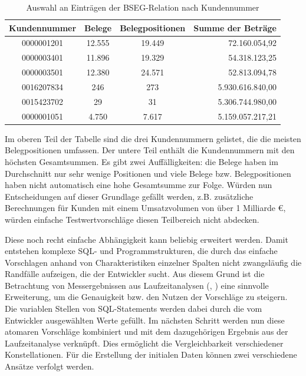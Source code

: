 \begin{table}[ht!]
	\centering
	\begin{tabular}{ |c|c|c|r| }
		\hline
		Kundennummer & Belege & Belegpositionen & Summe der Beträge\\
		\hline
		0000001201 & 12.555 & 19.449 & 72.160.054,92 \\
		0000003401 & 11.896 & 19.329 & 54.318.123,25 \\
		0000003501 & 12.380 & 24.571 & 52.813.094,78 \\
		\hline
		0016207834 & 246 & 273 & 5.930.616.840,00 \\
		0015423702 & 29 & 31 & 5.306.744.980,00 \\
		0000001051 & 4.750 & 7.617 & 5.159.057.217,21 \\
		\hline
	\end{tabular}
	\caption{Auswahl an Einträgen der BSEG-Relation nach Kundennummer}
	\label{tab:vergleichkonstellationen}
\end{table}

Im oberen Teil der Tabelle sind die drei Kundennummern gelistet, die die meisten Belegpositionen umfassen.
Der untere Teil enthält die Kundennummern mit den höchsten Gesamtsummen.
Es gibt zwei Auffälligkeiten: die Belege haben im Durchschnitt nur sehr wenige Positionen und viele Belege bzw. Belegpositionen haben nicht automatisch eine hohe Gesamtsumme zur Folge.
Würden nun Entscheidungen auf dieser Grundlage gefällt werden, z.B. zusätzliche Berechnungen für Kunden mit einem Umsatzvolumen von über 1 Milliarde \euro{}, würden einfache Testwertvorschläge diesen Teilbereich nicht abdecken.

Diese noch recht einfache Abhängigkeit kann beliebig erweitert werden.
Damit entstehen komplexe SQL- und Programmstrukturen, die durch das einfache Vorschlagen anhand von Charakteristiken einzelner Spalten nicht zwangsläufig die Randfälle aufzeigen, die der Entwickler sucht.
Aus diesem Grund ist die Betrachtung von Messergebnissen aus Laufzeitanalysen (\cite{Exner2014}, \cite{Mues2014}) eine sinnvolle Erweiterung, um die Genauigkeit bzw. den Nutzen der Vorschläge zu steigern.
Die variablen Stellen von SQL-Statements werden dabei durch die vom Entwickler ausgewählten Werte gefüllt.
Im nächsten Schritt werden nun diese atomaren Vorschläge kombiniert und mit dem dazugehörigen Ergebnis aus der Laufzeitanalyse verknüpft.
Dies ermöglicht die Vergleichbarkeit verschiedener Konstellationen.
Für die Erstellung der initialen Daten können zwei verschiedene Ansätze verfolgt werden.

